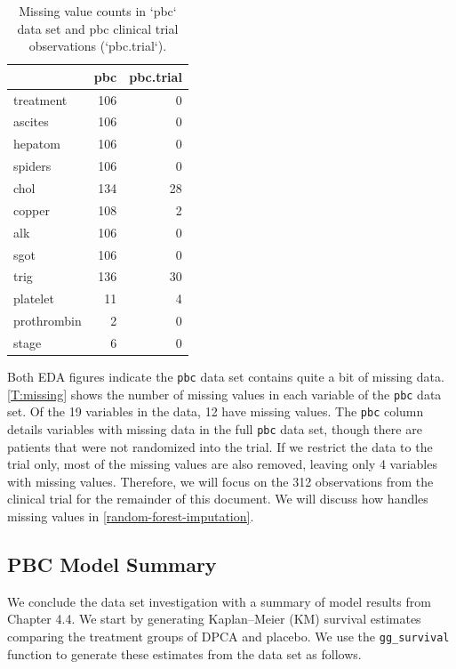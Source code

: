 \documentclass[article]{jss}
\begin{document}
\begin{table}

\caption{\label{tab:missing}Missing value counts in `pbc` data set and pbc clinical trial observations (`pbc.trial`).\label{T:missing}}
\centering
\begin{tabular}[t]{lrr}
\toprule
  & pbc & pbc.trial\\
\midrule
treatment & 106 & 0\\
ascites & 106 & 0\\
hepatom & 106 & 0\\
spiders & 106 & 0\\
chol & 134 & 28\\
\addlinespace
copper & 108 & 2\\
alk & 106 & 0\\
sgot & 106 & 0\\
trig & 136 & 30\\
platelet & 11 & 4\\
\addlinespace
prothrombin & 2 & 0\\
stage & 6 & 0\\
\bottomrule
\end{tabular}
\end{table}

Both EDA figures indicate the \texttt{pbc} data set contains quite a bit
of missing data. \autoref{T:missing} shows the number of missing values
in each variable of the \texttt{pbc} data set. Of the 19 variables in
the data, 12 have missing values. The \texttt{pbc} column details
variables with missing data in the full \texttt{pbc} data set, though
there are patients that were not randomized into the trial. If we
restrict the data to the trial only, most of the missing values are also
removed, leaving only 4 variables with missing values. Therefore, we
will focus on the 312 observations from the clinical trial for the
remainder of this document. We will discuss how 
handles missing values in \autoref{random-forest-imputation}.

\subsection{PBC Model Summary}\label{pbc-model-summary}

We conclude the data set investigation with a summary
of\citep{fleming:1991} model results from Chapter 4.4. We start by
generating Kaplan--Meier (KM) survival estimates comparing the treatment
groups of DPCA and placebo. We use the 
\texttt{gg\_survival} function to generate these estimates from the data
set as follows.
\end{document}
